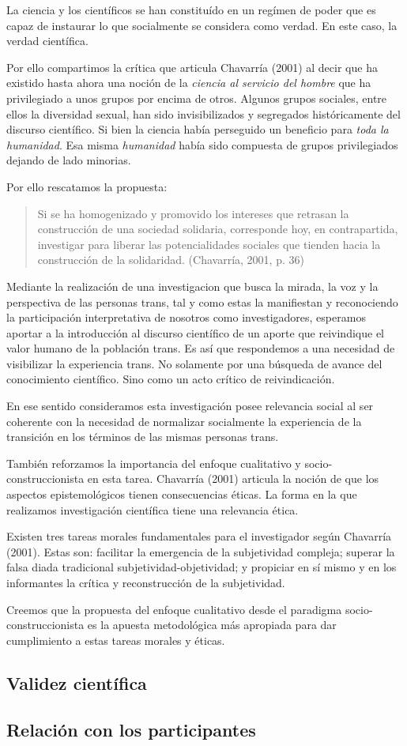 La ciencia y los científicos se han constituído en un regímen de poder que es
capaz de instaurar lo que socialmente se considera como verdad.
En este caso, la verdad científica.

Por ello compartimos la crítica que articula Chavarría (2001) al decir que ha
existido hasta ahora una noción de la \emph{ciencia al servicio del hombre}
que ha privilegiado a unos grupos por encima de otros.
Algunos grupos sociales, entre ellos la diversidad sexual, han sido
invisibilizados y segregados históricamente del discurso científico.
Si bien la ciencia había perseguido un beneficio para \emph{toda la humanidad}.
Esa misma \emph{humanidad} había sido compuesta de grupos privilegiados
dejando de lado minorias.

Por ello rescatamos la propuesta:

\begin{quote}
    Si se ha homogenizado y promovido los intereses que retrasan la construcción de
    una sociedad solidaria, corresponde hoy, en contrapartida, investigar para
    liberar las potencialidades sociales que tienden hacia la construcción de la
    solidaridad. (Chavarría, 2001, p. 36)
\end{quote}

Mediante la realización de una investigacion que busca la mirada,
la voz y la perspectiva de las personas trans, tal y como estas la
manifiestan y reconociendo la participación interpretativa de nosotros como
investigadores, esperamos aportar a la introducción al discurso científico de
un aporte que reivindique el valor humano de la población trans.
Es así que respondemos a una necesidad de visibilizar la experiencia trans.
No solamente por una búsqueda de avance del conocimiento científico.
Sino como un acto crítico de reivindicación.

En ese sentido consideramos esta investigación posee relevancia social al ser
coherente con la necesidad de normalizar socialmente la experiencia de la
transición en los términos de las mismas personas trans.

También reforzamos la importancia del enfoque cualitativo y
socio-construccionista en esta tarea.
Chavarría (2001) articula la noción de que los aspectos epistemológicos
tienen consecuencias éticas.
La forma en la que realizamos investigación científica tiene una relevancia
ética.

Existen tres tareas morales fundamentales para el investigador según
Chavarría (2001).
Estas son: facilitar la emergencia de la subjetividad compleja;
superar la falsa diada tradicional subjetividad-objetividad;
y propiciar en sí mismo y en los informantes la crítica y reconstrucción de
la subjetividad.

Creemos que la propuesta del enfoque cualitativo desde el paradigma
socio-construccionista es la apuesta metodológica más apropiada para dar
cumplimiento a estas tareas morales y éticas.

\subsection{Validez científica}


\subsection{Relación con los participantes}
